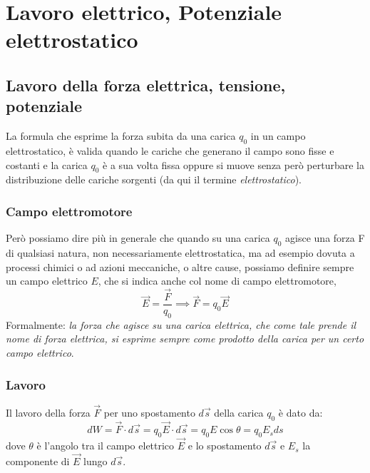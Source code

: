 \documentclass[class=book, crop=false, oneside, 12pt]{standalone}
\begin{document}
\chapter{Lavoro elettrico, Potenziale elettrostatico}

\section{Lavoro della forza elettrica, tensione, potenziale}

La formula che esprime la forza subita da una carica \(q_0\) in un campo elettrostatico, è valida quando le cariche che generano il campo sono fisse e costanti e la carica \(q_0\) è a sua volta fissa oppure si muove senza però perturbare la distribuzione delle cariche sorgenti (da qui il termine \emph{elettrostatico}).

\subsection{Campo elettromotore}

Però possiamo dire più in generale che quando su una carica \(q_0\) agisce una forza F di qualsiasi natura, non necessariamente elettrostatica, ma ad esempio dovuta a processi chimici o ad azioni meccaniche, o altre cause, possiamo definire sempre un campo elettrico \(E\), che si indica anche col nome di campo elettromotore,
\begin{equation} \label{campo_elettromotore}
    \overrightarrow{E} = \frac{\overrightarrow{F}}{q_0} \implies \overrightarrow{F} = q_0 \overrightarrow{E}
\end{equation}
Formalmente: \emph{la forza che agisce su una carica elettrica, che come tale prende il nome di forza elettrica, si esprime sempre come prodotto della carica per un certo campo elettrico}.

\subsection{Lavoro}

Il lavoro della forza \(\overrightarrow{F}\) per uno spostamento \(d \overrightarrow{s}\) della carica \(q_0\) è dato da:
\begin{equation}
    d W = \overrightarrow{F} \cdot d \overrightarrow{s} = q_0 \overrightarrow{E} \cdot d \overrightarrow{s} = q_0 E \cos \theta = q_0 E_s d s
\end{equation}
dove \(\theta\) è l'angolo tra il campo elettrico \(\overrightarrow{E}\) e lo spostamento \(d \overrightarrow{s}\) e \(E_s\) la componente di \(\overrightarrow{E}\) lungo \(d \overrightarrow{s}\).
\end{document}
